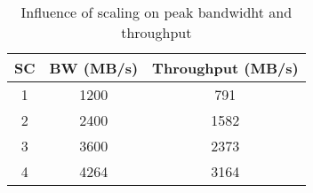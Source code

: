

\begin{table}[H]
\begin{center}
\begin{tabular}{ccc}
\toprule
\textbf{SC} & \textbf{BW (MB/s)} & \textbf{Throughput (MB/s)} \\ \midrule
1 & 1200 & 791 \\ 
2 & 2400 & 1582 \\ 
3 & 3600 & 2373 \\ 
4 & 4264 & 3164 \\ \bottomrule
\end{tabular}
\caption{Influence of scaling on peak bandwidht and throughput}
\label{tab:bwscale}
\end{center}
\end{table}
